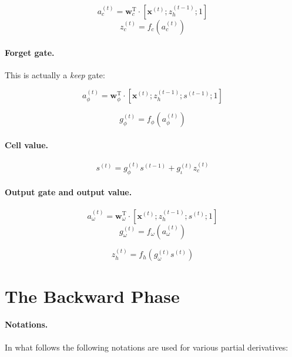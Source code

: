 \documentclass[11pt]{article}
\begin{document}
$$a_{c}^{(t)} = \mathbf{w}_{c}^{\text{T}} \cdot \left[\mathbf{x}^{(t)}; z_{h}^{(t-1)}; 1\right]$$
$$z_{c}^{(t)} = f_{c}\left(a_{c}^{(t)}\right)$$

\paragraph{Forget gate.} This is actually a \emph{keep} gate:

$$a_{\phi}^{(t)} = \mathbf{w}_{\phi}^{\text{T}} \cdot \left[\mathbf{x}^{(t)}; z_{h}^{(t-1)}; s^{(t-1)}; 1\right]$$

$$g_{\phi}^{(t)} = f_{\phi}\left(a_{\phi}^{(t)}\right)$$

\paragraph{Cell value.}

$$s^{(t)} = g_{\phi}^{(t)} s^{(t-1)} + g_{\iota}^{(t)} z_{c}^{(t)}$$

\paragraph{Output gate and output value.}

$$a_{\omega}^{(t)} = \mathbf{w}_{\omega}^{\text{T}} \cdot \left[\mathbf{x}^{(t)}; z_{h}^{(t-1)}; s^{(t)}; 1\right]$$
$$g_{\omega}^{(t)} = f_{\omega}\left(a_{\omega}^{(t)}\right)$$

$$z_h^{(t)} = f_h\left(g_{\omega}^{(t)} s^{(t)}\right)$$

\section{The Backward Phase}

\paragraph{Notations.} In what follows the following notations are used for various partial derivatives:
\end{document}

